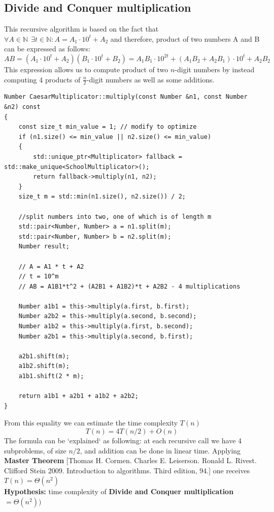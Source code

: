 \documentclass[12pt, oneside]{article}
\newenvironment{code}{\captionsetup{type=listing}}{}
\begin{document}
\subsection {Divide and Conquer multiplication}
  This recursive algorithm is based on the fact that $\displaystyle{\forall A \in \mathbb{N} \ \ \exists t \in \mathbb{N}: A = A_1 \cdot 10^t +  A_2} $ and therefore, product of two numbers A and B can be expressed as follows: 
  \[A B = (A_1\cdot10^t  + A_2)(B_1 \cdot 10^t +  B_2) = A_1B_1  \cdot 10^{2t} + (A_1B_2 + A_2B_1)\cdot 10^t + A_2B_2  \]
  This expression allows us to compute product of two $n$-digit numbers by instead computing 4 products of $\frac{n}{2}$-digit numbers as well as some additions.
     \begin{code}

  \begin{verbatim}
Number CaesarMultiplicator::multiply(const Number &n1, const Number &n2) const
{
    const size_t min_value = 1; // modify to optimize
    if (n1.size() <= min_value || n2.size() <= min_value)
    {
        std::unique_ptr<Multiplicator> fallback = std::make_unique<SchoolMultiplicator>();
        return fallback->multiply(n1, n2);
    }
    size_t m = std::min(n1.size(), n2.size()) / 2;

    //split numbers into two, one of which is of length m
    std::pair<Number, Number> a = n1.split(m);
    std::pair<Number, Number> b = n2.split(m);
    Number result;

    // A = A1 * t + A2
    // t = 10^m
    // AB = A1B1*t^2 + (A2B1 + A1B2)*t + A2B2 - 4 multiplications

    Number a1b1 = this->multiply(a.first, b.first);
    Number a2b2 = this->multiply(a.second, b.second);
    Number a1b2 = this->multiply(a.first, b.second);
    Number a2b1 = this->multiply(a.second, b.first);

    a2b1.shift(m);
    a1b2.shift(m);
    a1b1.shift(2 * m);

    return a1b1 + a2b1 + a1b2 + a2b2;
}

  \end{verbatim}
  \end{code}
  From this equality we can estimate the time complexity $T(n)$
  \[T(n) = 4T(n/2) + O(n)\]
  The formula can be `explained` as following: at each recursive call we have 4 subproblems, of size $n/2$, and addition can be done in linear time. Applying \textbf{Master Theorem} [Thomas H. Cormen. Charles E. Leiserson. Ronald L. Rivest. Clifford Stein 2009. Introduction to algorithms. Third edition, 94.] one receives $T(n) =\Theta(n^2)$
      \vspace{0.3cm}
\\ \textbf{Hypothesis:} time complexity of  \textbf{Divide and Conquer multiplication}$ =  \Theta(n^2))$
  
\end{document}
